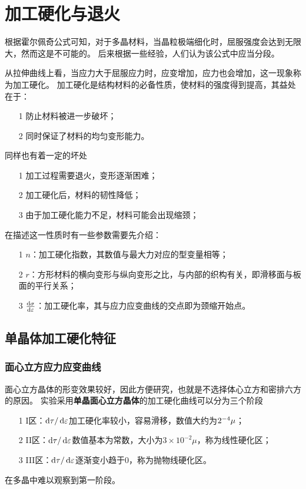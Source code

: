 \chapter{加工硬化与退火}
    根据霍尔佩奇公式可知，对于多晶材料，当晶粒极端细化时，屈服强度会达到无限大，然而这是不可能的。
    后来根据一些经验，人们认为该公式中应当分段。

    从拉伸曲线上看，当应力大于屈服应力时，应变增加，应力也会增加，这一现象称为加工硬化。
    加工硬化是结构材料的必备性质，使材料的强度得到提高，其益处在于：
    \begin{itemize}
        \item[1] 防止材料被进一步破坏；
        \item[2] 同时保证了材料的均匀变形能力。
    \end{itemize}
    同样也有着一定的坏处
    \begin{itemize}
        \item[1] 加工过程需要退火，变形逐渐困难；
        \item[2] 加工硬化后，材料的韧性降低；
        \item[3] 由于加工硬化能力不足，材料可能会出现缩颈；
    \end{itemize}
    在描述这一性质时有一些参数需要先介绍：
    \begin{itemize}
        \item[1] $n$：加工硬化指数，其数值与最大力对应的型变量相等；
        \item[2] $r$：方形材料的横向变形与纵向变形之比，与内部的织构有关，即滑移面与板面的平行关系；
        \item[3] $\frac{\mathop{}\!\mathrm{d} \sigma}{\mathop{}\!\mathrm{d} \varepsilon}$：加工硬化率，其与应力应变曲线的交点即为颈缩开始点。
    \end{itemize}
    \section{单晶体加工硬化特征}
        \subsection{面心立方应力应变曲线}
            面心立方晶体的形变效果较好，因此方便研究，也就是不选择体心立方和密排六方的原因。
            实验采用\textbf{单晶面心立方晶体}的加工硬化曲线可以分为三个阶段
            \begin{itemize}
                \item[1] I区：$\mathop{}\!\mathrm{d}\tau/\mathop{}\!\mathrm{d}\varepsilon$加工硬化率较小，容易滑移，数值大约为$2\time10^{-4}\mu$；
                \item[2] II区：$\mathop{}\!\mathrm{d}\tau/\mathop{}\!\mathrm{d}\varepsilon$数值基本为常数，大小为$3\times10^{-2}\mu$，称为线性硬化区；
                \item[3] III区：$\mathop{}\!\mathrm{d}\tau/\mathop{}\!\mathrm{d}\varepsilon$逐渐变小趋于0，称为抛物线硬化区。
            \end{itemize}
            在多晶中难以观察到第一阶段。

